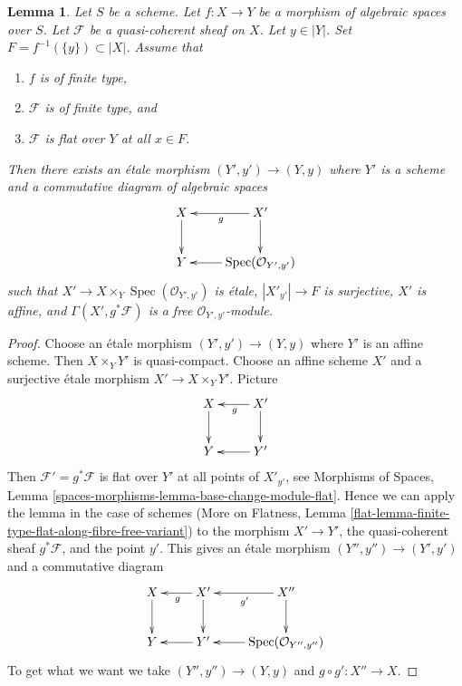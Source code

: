 \documentclass[10pt,a4paper]{amsart}
\theoremstyle{plain}
\newtheorem{lemma}[subsection]{Lemma}
\theoremstyle{definition}
\theoremstyle{remark}
\numberwithin{equation}{subsection}
\def\Spec{\mathop{\mathrm{Spec}}}
\begin{document}
\begin{lemma}
\label{lemma-finite-type-flat-along-fibre-free-variant}
Let $S$ be a scheme. Let $f : X \to Y$ be a morphism of algebraic spaces
over $S$. Let $\mathcal{F}$ be a quasi-coherent sheaf on $X$.
Let $y \in |Y|$. Set $F = f^{-1}(\{y\}) \subset |X|$. Assume that
\begin{enumerate}
\item $f$ is of finite type,
\item $\mathcal{F}$ is of finite type, and
\item $\mathcal{F}$ is flat over $Y$ at all $x \in F$.
\end{enumerate}
Then there exists an \'etale morphism $(Y', y') \to (Y, y)$
where $Y'$ is a scheme and a commutative diagram of algebraic spaces
$$
\xymatrix{
X \ar[d] & X' \ar[l]^g \ar[d] \\
Y & \Spec(\mathcal{O}_{Y', y'}) \ar[l]
}
$$
such that $X' \to X \times_Y \Spec(\mathcal{O}_{Y', y'})$
is \'etale, $|X'_{y'}| \to F$ is surjective, $X'$ is affine,
and $\Gamma(X', g^*\mathcal{F})$ is a free $\mathcal{O}_{Y', y'}$-module.
\end{lemma}

\begin{proof}
Choose an \'etale morphism $(Y', y') \to (Y, y)$ where $Y'$ is an
affine scheme. Then $X \times_Y Y'$ is quasi-compact.
Choose an affine scheme $X'$ and a surjective \'etale morphism
$X' \to X \times_Y Y'$. Picture
$$
\xymatrix{
X \ar[d] & X' \ar[l]^g \ar[d] \\
Y & Y' \ar[l]
}
$$
Then $\mathcal{F}' = g^*\mathcal{F}$ is flat over $Y'$ at all
points of $X'_{y'}$, see Morphisms of Spaces, Lemma
\ref{spaces-morphisms-lemma-base-change-module-flat}.
Hence we can apply the lemma in the case of schemes
(More on Flatness, Lemma
\ref{flat-lemma-finite-type-flat-along-fibre-free-variant})
to the morphism
$X' \to Y'$, the quasi-coherent sheaf $g^*\mathcal{F}$, and the point $y'$.
This gives an \'etale morphism $(Y'', y'') \to (Y', y')$ and a commutative
diagram
$$
\xymatrix{
X \ar[d] & X' \ar[l]^g \ar[d] & X'' \ar[l]^{g'} \ar[d] \\
Y & Y' \ar[l] & \Spec(\mathcal{O}_{Y'', y''}) \ar[l]
}
$$
To get what we want we take $(Y'', y'') \to (Y, y)$
and $g \circ g' : X'' \to X$.
\end{proof}
\end{document}
